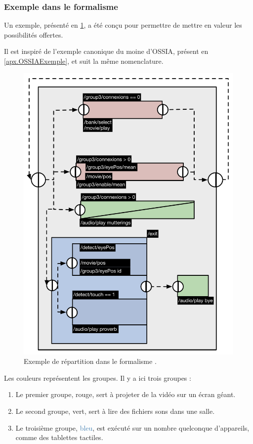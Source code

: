 \subsubsection{Exemple dans le formalisme}
Un exemple, présenté en \cref{fig.RepartOSSIA}, a été conçu pour permettre de mettre en valeur les possibilités offertes.

Il est inspiré de l'exemple canonique du moine d'\ac{OSSIA}, présent en \cref{apx.OSSIAExemple}, et suit la même nomenclature.

\begin{figure}[h]
	\centering
	\includegraphics[scale=0.7]{images/ossiaDistri.pdf}
	\caption{Exemple de répartition dans le formalisme .}
	\label{fig.RepartOSSIA}
\end{figure}

Les couleurs représentent les groupes.
Il y a ici trois groupes : 

\begin{enumerate}
	\item Le premier groupe, \textcolor{BrickRed}{rouge}, sert à projeter de la vidéo sur un écran géant.
	\item Le second groupe, \textcolor{OliveGreen}{vert}, sert à lire des fichiers sons dans une salle.
	\item Le troisième groupe, \textcolor{SteelBlue}{bleu}, est exécuté sur un nombre quelconque d'appareils, comme des tablettes tactiles.  
\end{enumerate}

